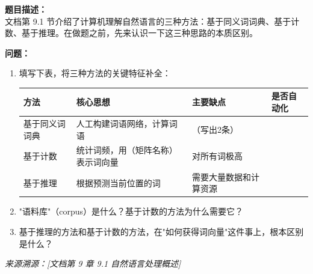 \documentclass[a4paper,11pt]{ctexart}
\begin{document}
\begin{problembox}
    \textbf{题目描述：}\\
    文档第 9.1 节介绍了计算机理解自然语言的三种方法：基于同义词词典、基于计数、基于推理。在做题之前，先来认识一下这三种思路的本质区别。

    \vspace{0.3cm}
    \textbf{问题：}
    \begin{enumerate}[(1)]
        \item 填写下表，将三种方法的关键特征补全：

        \begin{center}
        \begin{tabular}{p{3.2cm} p{3.5cm} p{4.5cm} p{2.8cm}}
            \toprule
            方法 & 核心思想 & 主要缺点 & 是否自动化 \\
            \midrule
            基于同义词词典 & 人工构建词语网络，计算词语\underline{\hspace{1.5cm}} & \underline{\hspace{3.5cm}}（写出2条） & \underline{\quad} \\[1.5em]
            基于计数 & 统计词频，用\underline{\hspace{1.5cm}}（矩阵名称）表示词向量 & 对所有词\underline{\hspace{2.5cm}}极高 & \underline{\quad} \\[1.5em]
            基于推理 & 根据\underline{\hspace{1.5cm}}预测当前位置的词 & 需要大量数据和计算资源 & \underline{\quad} \\
            \bottomrule
        \end{tabular}
        \end{center}

        \item "语料库"（corpus）是什么？基于计数的方法为什么需要它？
        \item 基于推理的方法和基于计数的方法，在"如何获得词向量"这件事上，根本区别是什么？
    \end{enumerate}

    \vspace{0.2cm}
    {\color{gray}\small\textit{来源溯源：[文档第 9 章 9.1 自然语言处理概述]}}
\end{problembox}
\end{document}
